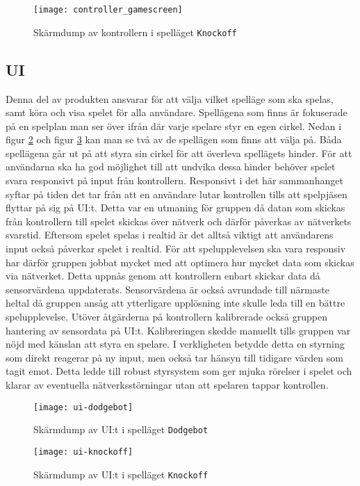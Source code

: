 \begin{figure}[h]
    \centering
    \texttt{[image: controller\_gamescreen]}
    \caption{Skärmdump av kontrollern i spelläget \texttt{Knockoff}}
    \label{fig:controller_gamescreen}
\end{figure}

\subsection{UI}
Denna del av produkten ansvarar för att välja vilket spelläge som ska spelas, samt köra och visa spelet för alla användare. Spellägena som finns är fokuserade på en spelplan man ser över ifrån där varje spelare styr en egen cirkel. Nedan i figur \ref{fig:ui-dodgebot} och figur \ref{fig:ui-knockoff} kan man se två av de spellägen som finns att välja på. Båda spellägena går ut på att styra sin cirkel för att överleva spellägets hinder. För att användarna ska ha god möjlighet till att undvika dessa hinder behöver spelet svara responsivt på input från kontrollern. Responsivt i det här sammanhanget syftar på tiden det tar från att en användare lutar kontrollen tills att spelpjäsen flyttar på sig på UI:t. Detta var en utmaning för gruppen då datan som skickas från kontrollern till spelet skickas över nätverk och därför påverkas av nätverkets svarstid. Eftersom spelet spelas i realtid är det alltså viktigt att användarens input också påverkar spelet i realtid. För att spelupplevelsen ska vara responsiv har därför gruppen jobbat mycket med att optimera hur mycket data som skickas via nätverket. Detta uppnås genom att kontrollern enbart skickar data då sensorvärdena uppdaterats. Sensorvärdena är också avrundade till närmaste heltal då gruppen ansåg att ytterligare upplösning inte skulle leda till en bättre spelupplevelse. Utöver åtgärderna på kontrollern kalibrerade också gruppen hantering av sensordata på UI:t. Kalibreringen skedde manuellt tills gruppen var nöjd med känslan att styra en spelare. I verkligheten betydde detta en styrning som direkt reagerar på ny input, men också tar hänsyn till tidigare värden som tagit emot. Detta ledde till robust styrsystem som ger mjuka rörelser i spelet och klarar av eventuella nätverksstörningar utan att spelaren tappar kontrollen. 

\begin{figure}[h]
    \centering
    \texttt{[image: ui-dodgebot]}
    \caption{Skärmdump av UI:t i spelläget \texttt{Dodgebot}}
    \label{fig:ui-dodgebot}
\end{figure}

\begin{figure}[h]
    \centering
    \texttt{[image: ui-knockoff]}
    \caption{Skärmdump av UI:t i spelläget \texttt{Knockoff}}
    \label{fig:ui-knockoff}
\end{figure}

